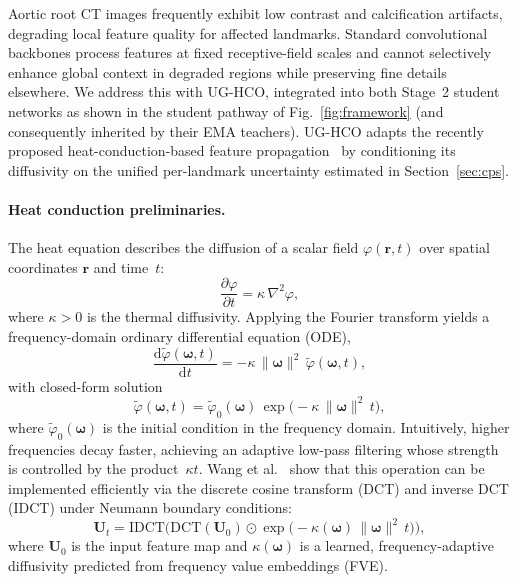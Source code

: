 \documentclass[conference]{IEEEtran}
\begin{document}
Aortic root CT images frequently exhibit low contrast and calcification artifacts, degrading local feature quality for affected landmarks. Standard convolutional backbones process features at fixed receptive-field scales and cannot selectively enhance global context in degraded regions while preserving fine details elsewhere. We address this with UG-HCO, integrated into both Stage~2 student networks as shown in the student pathway of Fig.~\ref{fig:framework} (and consequently inherited by their EMA teachers). UG-HCO adapts the recently proposed heat-conduction-based feature propagation~\cite{wang2025building} by conditioning its diffusivity on the unified per-landmark uncertainty estimated in Section~\ref{sec:cps}.

\paragraph{Heat conduction preliminaries.}
The heat equation describes the diffusion of a scalar field $\varphi(\mathbf{r}, t)$ over spatial coordinates $\mathbf{r}$ and time~$t$:
\begin{equation}
  \frac{\partial \varphi}{\partial t} = \kappa\,\nabla^2 \varphi,
  \label{eq:heat}
\end{equation}
where $\kappa > 0$ is the thermal diffusivity. Applying the Fourier transform yields a frequency-domain ordinary differential equation (ODE),
\begin{equation}
  \frac{\mathrm{d}\tilde{\varphi}(\boldsymbol{\omega},t)}{\mathrm{d}t}
    = -\kappa\,\|\boldsymbol{\omega}\|^2\,\tilde{\varphi}(\boldsymbol{\omega},t),
  \label{eq:heat_freq}
\end{equation}
with closed-form solution
\begin{equation}
  \tilde{\varphi}(\boldsymbol{\omega},t)
    = \tilde{\varphi}_0(\boldsymbol{\omega})\,\exp\!\bigl(-\kappa\,\|\boldsymbol{\omega}\|^2\,t\bigr),
  \label{eq:heat_sol}
\end{equation}
where $\tilde{\varphi}_0(\boldsymbol{\omega})$ is the initial condition in the frequency domain. Intuitively, higher frequencies decay faster, achieving an adaptive low-pass filtering whose strength is controlled by the product~$\kappa t$. Wang et al.~\cite{wang2025building} show that this operation can be implemented efficiently via the discrete cosine transform (DCT) and inverse DCT (IDCT) under Neumann boundary conditions:
\begin{equation}
  \mathbf{U}_t = \mathrm{IDCT}\!\bigl(
    \mathrm{DCT}(\mathbf{U}_0)
    \odot \exp\!\bigl(-\kappa(\boldsymbol{\omega})\,\|\boldsymbol{\omega}\|^2\,t\bigr)
  \bigr),
  \label{eq:dct_hco}
\end{equation}
where $\mathbf{U}_0$ is the input feature map and $\kappa(\boldsymbol{\omega})$ is a learned, frequency-adaptive diffusivity predicted from frequency value embeddings (FVE).
\end{document}
